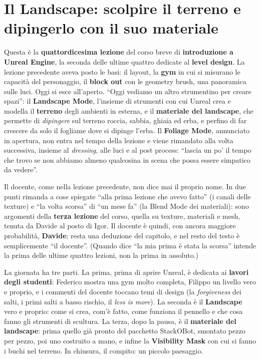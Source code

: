 \chapter[Il Landscape: scultura e materiale]{Il Landscape: scolpire il terreno e
dipingerlo con il suo materiale}
\label{ue14:cap:landscape}

Questa è la \textbf{quattordicesima lezione} del corso breve di \textbf{introduzione a
Unreal Engine}, la seconda delle ultime quattro dedicate al \textbf{level design}. La
lezione precedente aveva posto le basi: il layout, la \textbf{gym} in cui si misurano le
capacità del personaggio, il \textbf{block out} con le geometry brush, una panoramica
sulle luci. Oggi si esce all'aperto. ``Oggi vediamo un altro strumentino per creare
spazi'': il \textbf{Landscape Mode}, l'insieme di strumenti con cui Unreal crea e modella il
\textbf{terreno} degli ambienti in esterna, e il \textbf{materiale del landscape}, che
permette di \emph{dipingere} sul terreno roccia, sabbia, ghiaia ed erba, e perfino di far
crescere da solo il fogliame dove si dipinge l'erba. Il \textbf{Foliage Mode}, annunciato
in apertura, non entra nel tempo della lezione e viene rimandato alla volta successiva,
insieme al \emph{dressing}, alle luci e al post process: ``lascia un po' il tempo che
trovo se non abbiamo almeno qualcosina in scena che possa essere simpatico da vedere''.

Il docente, come nella lezione precedente, non dice mai il proprio nome. In due punti
rimanda a cose spiegate ``alla prima lezione che avevo fatto'' (i canali delle texture) e
``la volta scorsa'' di ``un mese fa'' (la Blend Mode dei materiali): sono argomenti della
\textbf{terza lezione} del corso, quella su texture, materiali e mesh, tenuta da Davide al
posto di Igor. Il docente è quindi, con ancora maggiore probabilità, \textbf{Davide}; resta
una deduzione del capitolo, e nel resto del testo è semplicemente ``il docente''. (Quando
dice ``la mia prima è stata la scorsa'' intende la prima delle ultime quattro lezioni, non
la prima in assoluto.)

La giornata ha tre parti. La prima, prima di aprire Unreal, è dedicata ai \textbf{lavori
degli studenti}: Federico mostra una gym molto completa, Filippo un livello vero e
proprio, e i commenti del docente toccano temi di design (la \emph{forgiveness} dei salti,
i primi salti a basso rischio, il \emph{less is more}). La seconda è il
\textbf{Landscape} vero e proprio: come si crea, com'è fatto, come funziona il pennello e
che cosa fanno gli strumenti di scultura. La terza, dopo la pausa, è il \textbf{materiale
del landscape}: prima quello già pronto del pacchetto StackOBot, smontato pezzo per pezzo,
poi uno costruito a mano, e infine la \textbf{Visibility Mask} con cui si fanno i buchi nel
terreno. In chiusura, il compito: un piccolo paesaggio.

